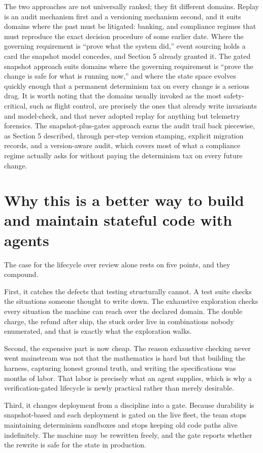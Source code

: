 \documentclass[11pt]{article}
\begin{document}
The two approaches are not universally ranked; they fit different domains.
Replay is an audit mechanism first and a versioning mechanism second, and it
suits domains where the past must be litigated: banking, and compliance regimes
that must reproduce the exact decision procedure of some earlier date. Where the
governing requirement is ``prove what the system did,'' event sourcing holds a
card the snapshot model concedes, and Section 5 already granted it. The gated
snapshot approach suits domains where the governing requirement is ``prove the
change is safe for what is running now,'' and where the state space evolves
quickly enough that a permanent determinism tax on every change is a serious
drag. It is worth noting that the domains usually invoked as the most
safety-critical, such as flight control, are precisely the ones that already
write invariants and model-check, and that never adopted replay for anything but
telemetry forensics. The snapshot-plus-gates approach earns the audit trail back
piecewise, as Section 5 described, through per-step version stamping, explicit
migration records, and a version-aware audit, which covers most of what a
compliance regime actually asks for without paying the determinism tax on every
future change.

\section{Why this is a better way to build and maintain stateful code with agents}

The case for the lifecycle over review alone rests on five points, and they
compound.

First, it catches the defects that testing structurally cannot. A test suite
checks the situations someone thought to write down. The exhaustive exploration
checks every situation the machine can reach over the declared domain. The
double charge, the refund after ship, the stuck order live in combinations
nobody enumerated, and that is exactly what the exploration walks.

Second, the expensive part is now cheap. The reason exhaustive checking never
went mainstream was not that the mathematics is hard but that building the
harness, capturing honest ground truth, and writing the specifications was
months of labor. That labor is precisely what an agent supplies, which is why a
verification-gated lifecycle is newly practical rather than merely desirable.

Third, it changes deployment from a discipline into a gate. Because durability
is snapshot-based and each deployment is gated on the live fleet, the team stops
maintaining determinism sandboxes and stops keeping old code paths alive
indefinitely. The machine may be rewritten freely, and the gate reports whether
the rewrite is safe for the state in production.
\end{document}
